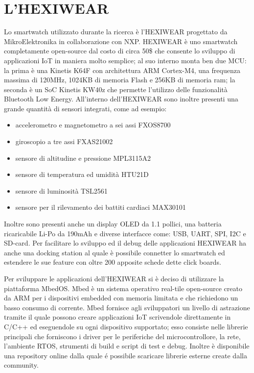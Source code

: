 \section{L'HEXIWEAR}

Lo smartwatch utilizzato durante la ricerca è l’HEXIWEAR progettato da MikroElektronika in collaborazione con NXP. HEXIWEAR è uno smartwatch completamente open-source dal costo di circa 50\$ che 
consente lo sviluppo di applicazioni IoT in maniera molto semplice; al suo interno monta ben due MCU: la prima è una Kinetis K64F con architettura ARM Cortex-M4, una frequenza massima di 120MHz, 
1024KB di memoria Flash e 256KB di memoria ram; la seconda è un SoC Kinetis KW40z che permette l’utilizzo delle funzionalità Bluetooth Low Energy. 
All'interno dell'HEXIWEAR sono inoltre presenti una grande quantità di sensori integrati, come ad esempio: 

\begin{itemize}
    \item accelerometro e magnetometro a sei assi FXOS8700
    \item giroscopio a tre assi FXAS21002
    \item sensore di altitudine e pressione MPL3115A2
    \item sensore di temperatura ed umidità HTU21D
    \item sensore di luminosità TSL2561
    \item sensore per il rilevamento dei battiti cardiaci MAX30101
\end{itemize}

Inoltre sono presenti anche un display OLED da 1.1 pollici, una batteria ricaricabile Li-Po da 190mAh e diverse interfacce come: USB, UART, SPI, I2C e SD-card.
Per facilitare lo sviluppo ed il debug delle applicazioni HEXIWEAR ha anche una docking station al quale è possibile connetter lo smartwatch ed estendere le sue feature con oltre 200 
apposite schede dette click boards.

Per sviluppare le applicazioni dell'HEXIWEAR si è deciso di utilizzare la piattaforma MbedOS. Mbed è un sistema operativo real-tile open-source creato da ARM per i dispositivi 
embedded con memoria limitata e che richiedono un basso consumo di corrente. 
Mbed fornisce agli sviluppatori un livello di astrazione tramite il quale possono creare applicazioni IoT scrivendole direttamente in C/C++ ed eseguendole su ogni dispositivo supportato; 
esso consiste nelle librerie principali che forniscono i driver per le periferiche del microcontrollore, la rete, l'ambiente RTOS, strumenti di build e script di test e debug. 
Inoltre è disponibile una repository online dalla quale é possibile scaricare librerie esterne create dalla community.
